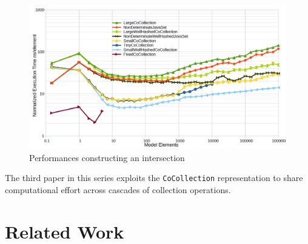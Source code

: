 \documentclass[
]{ceurart}
\begin{document}
\begin{figure}
	\begin{center}
		\includegraphics[width=6.0in]{Intersection.png}
	\end{center}
	\caption{Performances constructing an intersection}
	\label{fig:Intersection}
	\vspace{-20pt}
\end{figure}


The third paper \cite{Willink-Collections3} in this series exploits the \verb!CoCollection! representation to share computational effort across cascades of collection operations.

\section{Related Work}\label{Related Work}
\end{document}
